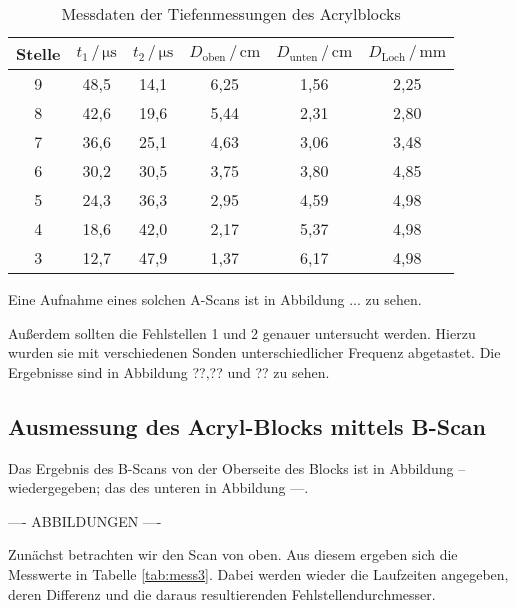 \begin{table}
\centering
\caption{Messdaten der Tiefenmessungen des Acrylblocks}
\label{tab:mess2}
\begin{tabular}{c c c c c c}
\toprule
Stelle & $t_1 \,/\, \si{\micro\second}$ & $t_2 \,/\, \si{\micro\second}$ &$D_\text{oben} \,/\, \si{\centi\meter}$&$D_\text{unten} \,/\, \si{\centi\meter}$ & $D_\text{Loch} \,/\, \si{\milli\meter}$\\
\midrule 
9 & 48,5 & 14,1 & 6,25 & 1,56 & 2,25 \\
8 & 42,6 & 19,6 & 5,44 & 2,31 & 2,80\\
7 & 36,6 & 25,1 & 4,63 & 3,06 & 3,48\\
6 & 30,2 & 30,5 & 3,75 & 3,80 & 4,85\\
5 & 24,3 & 36,3 & 2,95 & 4,59 & 4,98\\
4 & 18,6 & 42,0 & 2,17 & 5,37 & 4,98\\
3 & 12,7 & 47,9 & 1,37 & 6,17 & 4,98\\
\bottomrule
\end{tabular}
\end{table}

Eine Aufnahme eines solchen A-Scans ist in Abbildung ... zu sehen. 


Außerdem sollten die Fehlstellen 1 und 2 genauer untersucht werden. Hierzu wurden sie mit verschiedenen 
Sonden unterschiedlicher Frequenz abgetastet. Die Ergebnisse sind in Abbildung ??,?? und ?? zu sehen. 

\subsection{Ausmessung des Acryl-Blocks mittels B-Scan}

Das Ergebnis des B-Scans von der Oberseite des Blocks ist in Abbildung -- wiedergegeben; das
des unteren in Abbildung ---. 

---- ABBILDUNGEN ----

Zunächst betrachten wir den Scan von oben. Aus diesem ergeben sich die Messwerte in Tabelle \ref{tab:mess3}.
Dabei werden wieder die Laufzeiten angegeben, deren Differenz und die daraus resultierenden 
Fehlstellendurchmesser.  

